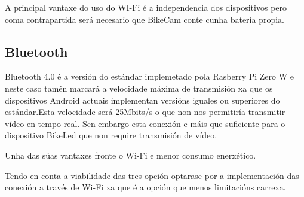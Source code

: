 A principal vantaxe do uso do WI-Fi é a independencia dos dispositivos pero coma contrapartida será necesario que BikeCam conte cunha batería propia.
\subsection{Bluetooth}
Bluetooth 4.0 é a versión do estándar implemetado pola Rasberry Pi Zero W e neste caso tamén marcará a velocidade máxima de transmisión xa que os dispositivos Android actuais implementan versións iguales ou superiores do estándar.Esta velocidade será 25Mbits/s o que non nos permitiría transmitir vídeo en tempo real. Sen embargo esta conexión e máis que suficiente para o dispositivo BikeLed que non require transmisión de vídeo.

Unha das súas vantaxes fronte o Wi-Fi e menor consumo enerxético.

Tendo en conta a viabilidade das tres opción optarase por a implementación das conexión a través de Wi-Fi xa que é a opción que menos limitacións carrexa.
